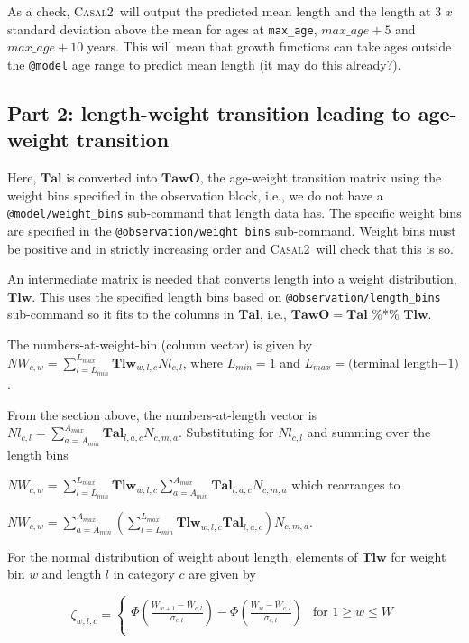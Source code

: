 \documentclass[a4paper,11pt,twoside,pdftex,draft]{article}
\newcommand{\CNAME}{\textsc{Casal2}}
\begin{document}
As a check, \CNAME~will output the predicted mean length and the length at 3 $x$ standard deviation above the mean for ages at  \texttt{max\_age}, $max\_age + 5$ and $max\_age + 10$ years. This will mean that growth functions can take ages outside the \texttt{@model} age range to predict mean length (it may do this already?). 


\subsection{Part 2: length-weight transition leading to age-weight transition}
Here, $\mathbf{Tal}$ is converted into $\mathbf{TawO}$, the age-weight transition matrix  using the weight bins specified in the observation block, i.e., we do not have a
\texttt{@model/weight\_bins} sub-command that length data has. The specific weight bins are specified in the \texttt{@observation/weight\_bins} sub-command.
 Weight bins must be positive and in strictly increasing order and \CNAME~will check that this is so.

An intermediate matrix is needed that converts length into a weight distribution, $\mathbf{Tlw}$. This uses the specified length bins based on \texttt{@observation/length\_bins} sub-command so it fits to the columns in $\mathbf{Tal}$, i.e., $\mathbf{TawO} =\mathbf{Tal} $ \%*\% $ \mathbf{Tlw} $.

The numbers-at-weight-bin (column vector) is given by $NW_{c,w} = \sum_{l=L_{min}}^{L_{max}}  \mathbf{Tlw}_{w,l,c} Nl_{c,l}$, where $L_{min} = 1$ and $L_{max} = ($terminal length$ - 1)$.

From the section above, the numbers-at-length vector is $Nl_{c,l} = \sum_{a=A_{min}}^{A_{max}}  \mathbf{Tal}_{l,a,c} N_{c,m,a}$. Substituting for $Nl_{c,l}$ and summing over the length bins

$NW_{c,w} = \sum_{l=L_{min}}^{L_{max}}  \mathbf{Tlw}_{w,l,c} \sum_{a=A_{min}}^{A_{max}}  \mathbf{Tal}_{l,a,c} N_{c,m,a}$ which rearranges to 

$NW_{c,w} = \sum_{a=A_{min}}^{A_{max}} \left( \sum_{l=L_{min}}^{L_{max}}  \mathbf{Tlw}_{w,l,c}  \mathbf{Tal}_{l,a,c}\right) N_{c,m,a}$. 

For the normal distribution of weight about length, 
elements of $\mathbf{Tlw}$ for weight bin $w$ and length $l$ in category $c$ are given by

\begin{equation}
\zeta_{w,l,c} =
\begin{cases}

\Phi\left( \frac{W_{w+1} - \bar W_{c,l}   }{\sigma_{c,l}} \right)   - \Phi\left( \frac{W_{w} - \bar W_{c,l}   }{\sigma_{c,l}} \right) & \text{for } 1 \geq w \leq W \\

\end{cases}
\end{equation}
\end{document}
